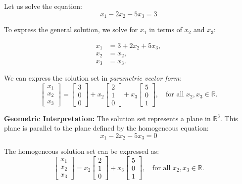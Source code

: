 \begin{solution}
        Let us solve the equation:
        \[
        x_1 - 2 x_2 - 5 x_3 = 3
        \]
        
        To express the general solution, we solve for \( x_1 \) in terms of \( x_2 \) and \( x_3 \):
    
        \[
        \begin{aligned}
        x_1 &= 3 + 2x_2 + 5x_3, \\
        x_2 &= x_2, \\
        x_3 &= x_3.
        \end{aligned}
        \]
        
        We can express the solution set in \textit{parametric vector form}:
        \[
        \begin{bmatrix}
        x_1 \\
        x_2 \\
        x_3
        \end{bmatrix}
        =
        \begin{bmatrix}
        3 \\
        0 \\
        0
        \end{bmatrix}
        +
        x_2
        \begin{bmatrix}
        2 \\
        1 \\
        0
        \end{bmatrix}
        +
        x_3
        \begin{bmatrix}
        5 \\
        0 \\
        1
        \end{bmatrix}, \quad \text{for all } x_2, x_3 \in \mathbb{R}.
        \]
        
        \textbf{Geometric Interpretation:} The solution set represents a plane in \(\mathbb{R}^3\). This plane is parallel to the plane defined by the homogeneous equation:
        \[
        x_1 - 2 x_2 - 5 x_3 = 0
        \]
        
        The homogeneous solution set can be expressed as:
        \[
        \begin{bmatrix}
        x_1 \\
        x_2 \\
        x_3
        \end{bmatrix}
        =
        x_2
        \begin{bmatrix}
        2 \\
        1 \\
        0
        \end{bmatrix}
        +
        x_3
        \begin{bmatrix}
        5 \\
        0 \\
        1
        \end{bmatrix}, \quad \text{for all } x_2, x_3 \in \mathbb{R}.
        \]
        

\end{solution}
